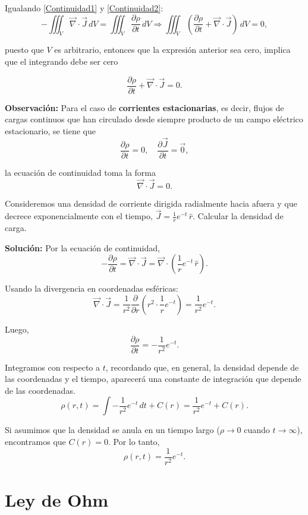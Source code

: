 Igualando \eqref{Continuidad1} y \eqref{Continuidad2}:
$$- \iiint_V \vec{\nabla} \cdot \vec{J} \,dV  = \iiint_V \frac{\partial \rho}{\partial t} \,dV \Rightarrow \iiint_V \left( \frac{\partial \rho}{\partial t} + \vec{\nabla} \cdot \vec{J} \right) \,dV = 0,$$

puesto que $V$ es arbitrario, entonces que la expresión anterior sea cero, implica que el integrando debe ser cero
\begin{shaded}
 $$\frac{\partial \rho}{\partial t} + \vec{\nabla} \cdot \vec{J} = 0.$$   
\end{shaded}

\textbf{Observación:} Para el caso de \textbf{corrientes estacionarias}, es decir, flujos de cargas continuos que han circulado desde siempre producto de un campo eléctrico estacionario, se tiene que
$$\frac{\partial \rho}{\partial t} = 0, \quad \frac{\partial \Vec{J}}{\partial t} = \Vec{0},$$

la ecuación de continuidad toma la forma
$$\vec{\nabla} \cdot \vec{J} = 0.$$

\begin{ejemplo}
Consideremos una densidad de corriente dirigida radialmente hacia afuera y que decrece exponencialmente con el tiempo, $\Vec{J} = \frac{1}{r} e^{-t} \,\hat{r}$. Calcular la densidad de carga.

\textbf{Solución:} Por la ecuación de continuidad,
$$- \frac{\partial \rho}{\partial t} = \vec{\nabla} \cdot \Vec{J} = \vec{\nabla} \cdot \left( \frac{1}{r} e^{-t} \,\hat{r}\right).$$

Usando la divergencia en coordenadas esféricas:
$$\Vec{\nabla} \cdot \Vec{J} = \frac{1}{r^2} \frac{\partial}{\partial r}  \left( r^2 \cdot\frac{1}{r} e^{-t} \right) = \frac{1}{r^2} e^{-t}.$$

Luego,
$$\frac{\partial \rho}{\partial t} = - \frac{1}{r^2} e^{-t}.$$

Integramos con respecto a $t$, recordando que, en general, la densidad depende de las coordenadas y el tiempo, aparecerá una constante de integración que depende de las coordenadas.
$$\rho(r,t) = \int - \frac{1}{r^2} e^{-t} \,dt + C(r) = \frac{1}{r^2} e^{-t} + C(r).$$

Si asumimos que la densidad se anula en un tiempo largo ($\rho \to 0$ cuando $t \to \infty$), encontramos que $C(r) = 0$. Por lo tanto,
$$\rho(r,t) = \frac{1}{r^2} e^{-t}.$$
\end{ejemplo}

\section{Ley de Ohm}

